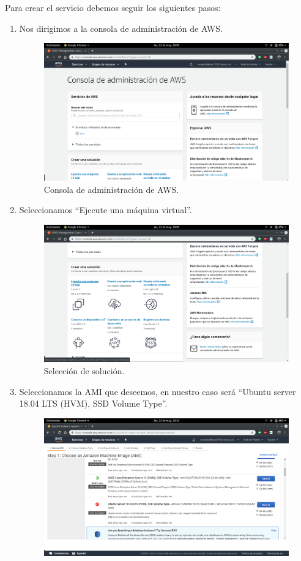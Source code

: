Para crear el servicio debemos seguir los siguientes pasos:
\newpage
\begin{enumerate}
	\item Nos dirigimos a la consola de administración de AWS.
	\begin{figure}[h]
		\centering
		\includegraphics[scale=0.28]{ImagenesAWS/1.png}
		\caption{Consola de administración de AWS.}
		\label{Consola de administración de AWS}
	\end{figure}
	\item Seleccionamos ``Ejecute una máquina virtual''.
	\begin{figure}[h]
		\centering
		\includegraphics[scale=0.28]{ImagenesAWS/3.png}
		\caption{Selección de solución.}
		\label{Selección de solución}
	\end{figure}
\newpage
	\item Seleccionamos la AMI que deseemos, en nuestro caso será ``Ubuntu server 18.04 LTS (HVM), SSD Volume Type''.
	\begin{figure}[h]
		\centering
		\includegraphics[scale=0.28]{ImagenesAWS/5.png}

\end{figure}
\end{enumerate}
